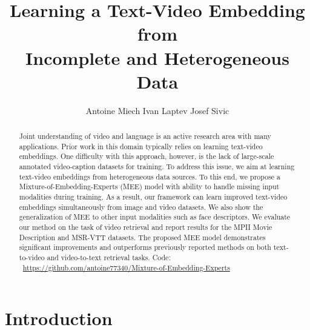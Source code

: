 \documentclass[runningheads]{llncs}
\begin{document}
\pagestyle{headings}
\mainmatter
\def\ECCV18SubNumber{21}  


\title{Learning a Text-Video Embedding from \\ Incomplete and Heterogeneous Data} 





\author{Antoine Miech \qquad Ivan Laptev \qquad Josef Sivic}


\maketitle

\begin{abstract}


Joint understanding of video and language is an active research area with many applications.
Prior work in this domain typically relies on learning text-video embeddings.
One difficulty with this approach, however, is the lack of large-scale annotated video-caption datasets for training.
To address this issue, we aim at learning text-video embeddings from heterogeneous data sources.
To this end, we propose a Mixture-of-Embedding-Experts (MEE) model with ability to handle missing input modalities during training.
As a result, our framework can learn improved text-video embeddings simultaneously from image and video datasets.
We also show the generalization of MEE to other input modalities such as face descriptors.
We evaluate our method on the task of video retrieval and report results for the MPII Movie Description and MSR-VTT datasets.
The proposed MEE model demonstrates significant improvements and outperforms previously reported methods on both text-to-video and video-to-text retrieval tasks. Code: \ \url{https://github.com/antoine77340/Mixture-of-Embedding-Experts}


\end{abstract}


\section{Introduction}
\end{document}
